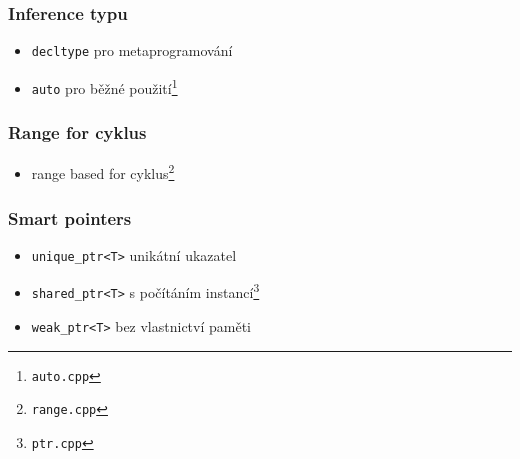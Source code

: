 \begin{frame} \frametitle{Inference typu}
	\begin{itemize}
		\item{\texttt{decltype} pro metaprogramování}
		\item{\texttt{auto} pro běžné použití\footnote{\texttt{auto.cpp}}}
	\end{itemize}
\end{frame}

\begin{frame} \frametitle{Range for cyklus}
	\begin{itemize}
		\item{range based for cyklus\footnote{\texttt{range.cpp}}}
	\end{itemize}
\end{frame}

\begin{frame} \frametitle{Smart pointers}
	\begin{itemize}
		\item{\texttt{unique\_ptr<T>} unikátní ukazatel}
		\item{\texttt{shared\_ptr<T>} s počítáním instancí\footnote{\texttt{ptr.cpp}}}
		\item{\texttt{weak\_ptr<T>} bez vlastnictví paměti}
	\end{itemize}
\end{frame}




